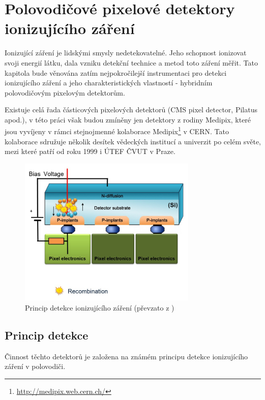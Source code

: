 

\chapter{Polovodičové pixelové detektory ionizujícího záření}\label{det}
Ionizující záření je lidskými smysly nedetekovatelné. Jeho schopnost ionizovat svoji energií látku, dala vzniku detekční technice a metod toto záření měřit. Tato kapitola bude věnována zatím nejpokročilejší instrumentaci pro detekci ionizujícího záření a jeho charakteristických vlastností - hybridním polovodičovým pixelovým detektorům.

Existuje celá řada částicových pixelových detektorů (CMS pixel detector, Pilatus apod.), v této práci však budou zmíněny jen detektory z rodiny Medipix, které jsou vyvíjeny v rámci stejnojmenné kolaborace Medipix\footnote{\url{http://medipix.web.cern.ch/}} v CERN. Tato kolaborace sdružuje několik desítek vědeckých institucí a univerzit po celém světe, mezi které patří od roku 1999 i ÚTEF ČVUT v Praze.

\begin{figure}[th!]
	\begin{center}
		\includegraphics[width=8.5cm]{figures/det_recombination.png}
		\caption{Princip detekce ionizujícího záření (převzato z \cite{PlatkevicDisertace})}
		\label{fig:det:recomb}
	\end{center}
\end{figure}

\section{Princip detekce}
Činnost těchto detektorů je založena na známém principu detekce ionizujícího záření v polovodiči. 

